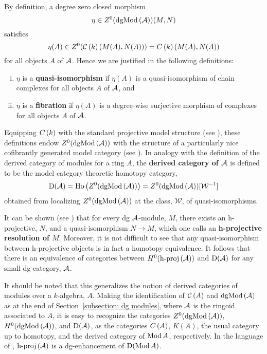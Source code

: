 By definition, a degree zero closed morphism
\[\eta \in Z^0(\operatorname{dgMod}\left(\mathcal{A}\right))(M,N)\]
satisfies
\[\eta(A) \in Z^0(\mathcal{C}\left(k\right)(M(A), N(A))) = C\left(k\right)(M(A), N(A))\]
for all objects \(A\) of \(\mathcal{A}\).
Hence we are justified in the following definitions:
\begin{enumerate}[(i)]
\item
  \(\eta\) is a \textbf{quasi-isomorphism} if \(\eta(A)\) is a quasi-isomorphism of chain complexes for all objects \(A\) of \(\mathcal{A}\), and
\item
  \(\eta\) is a \textbf{fibration} if \(\eta(A)\) is a degree-wise surjective morphism of complexes for all objects \(A\) of \(\mathcal{A}\).
\end{enumerate}
Equipping \(C\left(k\right)\) with the standard projective model structure (see \parencite[Section 2.3]{Hovey99}), these definitions endow \(Z^0(\operatorname{dgMod}\left(\mathcal{A}\right))\) with the structure of a particularly nice cofibrantly generated model category (see \parencite[Section 3]{Toen07}).
In analogy with the definition of the derived category of modules for a ring \(A\), the \textbf{derived category of \(\mathcal{A}\)} is defined to be the model category theoretic homotopy category,
\[\mathrm{D}(\mathcal{A}) = \operatorname{Ho}\left(Z^0(\operatorname{dgMod}\left(\mathcal{A}\right))\right) = Z^0(\operatorname{dgMod}\left(\mathcal{A}\right))[\mathcal{W}^{-1}]\]
obtained from localizing \(Z^0(\operatorname{dgMod}\left(\mathcal{A}\right))\) at the class, \(\mathcal{W}\), of quasi-isomorphisms.

It can be shown (see \parencite[Section 3.5]{Keller95}) that for every dg \(\mathcal{A}\)-module, \(M\), there exists an h-projective, \(N\), and a quasi-isomorphism \(N \to M\), which one calls an \textbf{h-projective resolution of \(M\)}.
Moreover, it is not difficult to see that any quasi-isomorphism between h-projective objects is in fact a homotopy equivalence.
It follows that there is an equivalence of categories between \(H^0(\operatorname{h-proj}\left(\mathcal{A}\right))\) and \(\mathrm{D}(\mathcal{A})\) for any small dg-category, \(\mathcal{A}\).

It should be noted that this generalizes the notion of derived categories of modules over a $k$-algebra, $A$.
Making the identification of $\mathcal{C}\left(A\right)$ and $\operatorname{dgMod}\left(\mathcal{A}\right)$ as at the end of Section~\ref{subsection: dg modules}, where $\mathcal{A}$ is the ringoid associated to $A$, it is easy to recognize the categories \(Z^0(\operatorname{dgMod}\left(\mathcal{A}\right))\), \(H^0(\operatorname{dgMod}\left(\mathcal{A}\right))\), and \(\mathrm{D}(\mathcal{A})\), as the categories \(C\left(A\right)\), \(K(A)\), the usual category up to homotopy, and the derived category of \(\operatorname{Mod}A\), respectively.
In the language of \parencite{Lunts-Orlov}, \(\operatorname{h-proj}\left(\mathcal{A}\right)\) is a dg-enhancement of \(\mathrm{D}(\operatorname{Mod}A)\).


